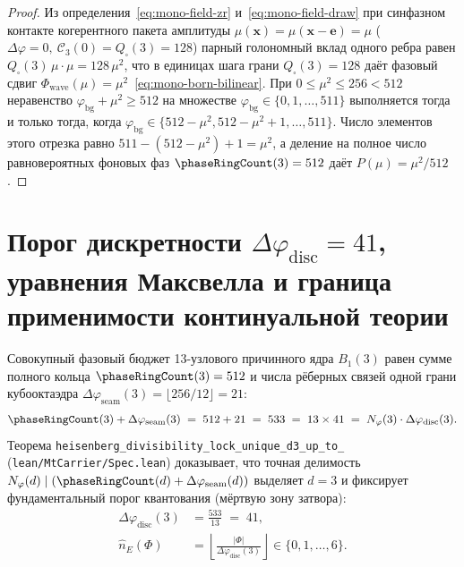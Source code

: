 \begin{proof}
Из определения~\eqref{eq:mono-field-zr} и~\eqref{eq:mono-field-draw} при синфазном контакте когерентного пакета амплитуды $\mu(\mathbf{x}) = \mu(\mathbf{x}-\mathbf{e}) = \mu$ ($\Delta\varphi = 0,\ \mathcal{C}_3(0) = Q_\square(3) = 128$) парный голономный вклад одного ребра равен $Q_\square(3)\,\mu\cdot\mu = 128\,\mu^2$, что в единицах шага грани $Q_\square(3) = 128$ даёт фазовый сдвиг $\Phi_{\mathrm{wave}}(\mu) = \mu^2$~\eqref{eq:mono-born-bilinear}. При $0 \le \mu^2 \le 256 < 512$ неравенство $\varphi_{\mathrm{bg}} + \mu^2 \ge 512$ на множестве $\varphi_{\mathrm{bg}} \in \{0, 1, \dots, 511\}$ выполняется тогда и только тогда, когда $\varphi_{\mathrm{bg}} \in \{512 - \mu^2, 512 - \mu^2 + 1, \dots, 511\}$. Число элементов этого отрезка равно $511 - (512 - \mu^2) + 1 = \mu^2$, а деление на полное число равновероятных фоновых фаз $\phaseRingCount(3) = 512$ даёт $P(\mu) = \mu^2 / 512$.
\end{proof}

\section{Порог дискретности \texorpdfstring{$\Delta\varphi_{\mathrm{disc}} = 41$}{dphi = 41}, уравнения Максвелла и граница применимости континуальной теории}

Совокупный фазовый бюджет 13-узлового причинного ядра $B_1(3)$ равен сумме полного кольца $\phaseRingCount(3) = 512$ и числа рёберных связей одной грани кубооктаэдра $\Delta\varphi_{\mathrm{seam}}(3) = \lfloor 256 / 12 \rfloor = 21$:
\begin{equation}
  \label{eq:mono-heisenberg-lock}
  \phaseRingCount(3) + \Delta\varphi_{\mathrm{seam}}(3) \;=\; 512 + 21 \;=\; 533 \;=\; 13 \times 41 \;=\; N_\varphi(3)\cdot \Delta\varphi_{\mathrm{disc}}(3).
\end{equation}
Теорема \texttt{heisenberg\_\allowbreak divisibility\_\allowbreak lock\_\allowbreak unique\_\allowbreak d3\_\allowbreak up\_\allowbreak to\_} (\texttt{lean/MtCarrier/Spec.lean}) доказывает, что точная делимость $N_\varphi(d) \mid (\phaseRingCount(d) + \Delta\varphi_{\mathrm{seam}}(d))$ выделяет $d = 3$ и фиксирует фундаментальный порог квантования (мёртвую зону затвора):
\begin{align}
  \Delta\varphi_{\mathrm{disc}}(3) &= \frac{533}{13} \;=\; 41, \label{eq:mono-heisenberg-41} \\
  \hat{n}_E(\Phi) &= \left\lfloor \frac{|\Phi|}{\Delta\varphi_{\mathrm{disc}}(3)} \right\rfloor \in \{0, 1, \dots, 6\}. \label{eq:mono-heisenberg-quanta}
\end{align}

